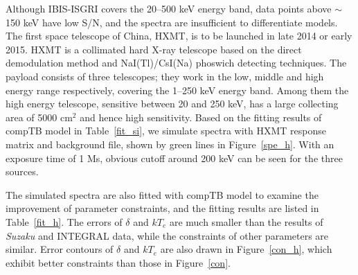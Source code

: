 \documentclass[]{raa}
\begin{document}
Although IBIS-ISGRI covers the 20--500 keV energy band, data points above $\sim$ 150 keV have low S/N, and the spectra are insufficient to differentiate models.
%
The first space telescope of China, HXMT, is to be launched in late 2014 or early 2015.
%
HXMT is a collimated hard X-ray telescope based on the direct demodulation method and NaI(Tl)/CsI(Na) phoswich detecting techniques. 
%
The payload consists of three telescopes; they work in the low, middle and high energy range respectively, covering the 1--250 keV energy band. 
%
Among them the high energy telescope, sensitive between 20 and 250 keV, has a large collecting area of 5000 cm$^2$ and hence high sensitivity.
%
Based on the fitting results of compTB model in Table~\ref{fit_si}, we simulate spectra with HXMT response matrix and background file, shown by green lines in Figure~\ref{spe_h}.
%
With an exposure time of 1 Ms, obvious cutoff around 200 keV can be seen for the three sources.
% 

The simulated spectra are also fitted with compTB model to examine the improvement of parameter constraints, and the fitting results are listed in Table~\ref{fit_h}.
%
The errors of $\delta$ and $kT_e$ are much smaller than the results of {\it Suzaku} and INTEGRAL data, while the constraints of other parameters are similar.
%
Error contours of $\delta$ and $kT_e$ are also drawn in Figure~\ref{con_h}, which exhibit better constraints than those in Figure~\ref{con}.
\end{document}
